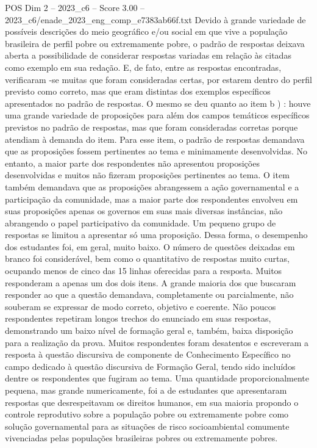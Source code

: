 \begin{textsample}{POS Dim 2 – 2023\_c6 – Score 3.00 – 2023\_c6/enade\_2023\_eng\_comp\_e7383ab66f.txt}
Devido à grande variedade de possíveis descrições do meio geográfico e/ou social em que vive a população brasileira de perfil pobre ou extremamente pobre, o padrão de respostas deixava aberta a possibilidade de considerar respostas variadas em relação às citadas como exemplo em sua redação.
E, de fato, entre as respostas encontradas, verificaram -se muitas que foram consideradas certas, por estarem dentro do perfil previsto como correto, mas que eram distintas dos exemplos específicos apresentados no padrão de respostas.
O mesmo se deu quanto ao item b ) : houve uma grande variedade de proposições para além dos campos temáticos específicos previstos no padrão de respostas, mas que foram consideradas corretas porque atendiam à demanda do item.
Para esse item, o padrão de respostas demandava que as proposições fossem pertinentes ao tema e minimamente desenvolvidas.
No entanto, a maior parte dos respondentes não apresentou proposições desenvolvidas e muitos não fizeram proposições pertinentes ao tema.
O item também demandava que as proposições abrangessem a ação governamental e a participação da comunidade, mas a maior parte dos respondentes envolveu em suas proposições apenas os governos em suas mais diversas instâncias, não abrangendo o papel participativo da comunidade.
Um pequeno grupo de respostas se limitou a apresentar só uma proposição.
Dessa forma, o desempenho dos estudantes foi, em geral, muito baixo.
O número de questões deixadas em branco foi considerável, bem como o quantitativo de respostas muito curtas, ocupando menos de cinco das 15 linhas oferecidas para a resposta.
Muitos responderam a apenas um dos dois itens.
A grande maioria dos que buscaram responder ao que a questão demandava, completamente ou parcialmente, não souberam se expressar de modo correto, objetivo e coerente.
Não poucos respondentes repetiram longos trechos do enunciado em suas respostas, demonstrando um baixo nível de formação geral e, também, baixa disposição para a realização da prova.
Muitos respondentes foram desatentos e escreveram a resposta à questão discursiva de componente de Conhecimento Específico no campo dedicado à questão discursiva de Formação Geral, tendo sido incluídos dentre os respondentes que fugiram ao tema.
Uma quantidade proporcionalmente pequena, mas grande numericamente, foi a de estudantes que apresentaram respostas que desrespeitavam os direitos humanos, em sua maioria propondo o controle reprodutivo sobre a população pobre ou extremamente pobre como solução governamental para as situações de risco socioambiental comumente vivenciadas pelas populações brasileiras pobres ou extremamente pobres.

\end{textsample}
